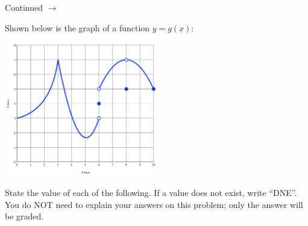 \documentclass[addpoints]{exam}
\def\pageturn{\vfill
\begin{flushright}
	\begin{small}
		Continued $\rightarrow$
	\end{small}
\end{flushright}
\newpage}
\begin{document}
\begin{questions}


\pageturn


\question Shown below is the graph of a function $y = g(x)$: 
\begin{center}
	\includegraphics[width=0.5\textwidth]{a1-plot2}
\end{center}
State the value of each of the following. If a value does not exist, write ``DNE''. You do NOT need to explain your answers on this problem; only the answer will be graded. 

\end{questions}
\end{document}
